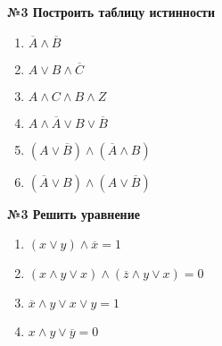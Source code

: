     \begin{center}
        \textbf{№3 Построить таблицу истинности}
    \end{center}

    \begin{enumerate}
        \item $\overline A \wedge \overline B$
        \item $A \vee B \wedge \overline C$
        \item $A \wedge C \wedge B \wedge Z$
        \item $A \wedge \overline A \vee B \vee \overline B$

        \item $(A \vee \overline B) \wedge (\overline A \wedge B)$
        \item $(\overline A \vee B) \wedge (A \vee \overline B)$
    \end{enumerate}

    \begin{center}
        \textbf{№3 Решить уравнение}
    \end{center}

    \begin{enumerate}
        \item $(x \vee y) \wedge \overline x = 1$
        \item $(x \wedge y \vee x) \wedge(\overline z \wedge y \vee x) = 0$
        \item $\overline x \wedge y \vee x \vee y = 1$
        \item $x \wedge y \vee \overline y = 0$
    \end{enumerate}

